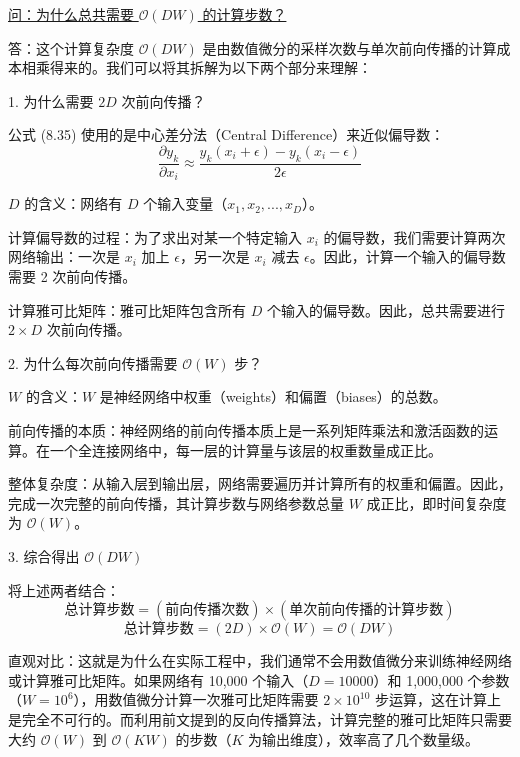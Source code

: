 \documentclass{article}
\begin{document}
{\color{blue}
\underline{问：为什么总共需要 $\mathcal{O}(DW)$ 的计算步数？}

答：这个计算复杂度 $\mathcal{O}(DW)$ 是由数值微分的采样次数与单次前向传播的计算成本相乘得来的。我们可以将其拆解为以下两个部分来理解：

1. 为什么需要 $2D$ 次前向传播？

公式 (8.35) 使用的是中心差分法（Central Difference）来近似偏导数：
$$ \frac{\partial y_k}{\partial x_i} \approx \frac{y_k(x_i + \epsilon) - y_k(x_i - \epsilon)}{2\epsilon} $$

$D$ 的含义：网络有 $D$ 个输入变量（$x_1, x_2, ..., x_D$）。

计算偏导数的过程：为了求出对某一个特定输入 $x_i$ 的偏导数，我们需要计算两次网络输出：一次是 $x_i$ 加上 $\epsilon$，另一次是 $x_i$ 减去 $\epsilon$。因此，计算一个输入的偏导数需要 2 次前向传播。

计算雅可比矩阵：雅可比矩阵包含所有 $D$ 个输入的偏导数。因此，总共需要进行 $2 \times D$ 次前向传播。

2. 为什么每次前向传播需要 $\mathcal{O}(W)$ 步？

$W$ 的含义：$W$ 是神经网络中权重（weights）和偏置（biases）的总数。

前向传播的本质：神经网络的前向传播本质上是一系列矩阵乘法和激活函数的运算。在一个全连接网络中，每一层的计算量与该层的权重数量成正比。

整体复杂度：从输入层到输出层，网络需要遍历并计算所有的权重和偏置。因此，完成一次完整的前向传播，其计算步数与网络参数总量 $W$ 成正比，即时间复杂度为 $\mathcal{O}(W)$。

3. 综合得出 $\mathcal{O}(DW)$

将上述两者结合：
$$ \text{总计算步数} = (\text{前向传播次数}) \times (\text{单次前向传播的计算步数}) $$
$$ \text{总计算步数} = (2D) \times \mathcal{O}(W) = \mathcal{O}(DW) $$

直观对比：这就是为什么在实际工程中，我们通常不会用数值微分来训练神经网络或计算雅可比矩阵。如果网络有 10,000 个输入（$D=10000$）和 1,000,000 个参数（$W=10^6$），用数值微分计算一次雅可比矩阵需要 $2 \times 10^{10}$ 步运算，这在计算上是完全不可行的。而利用前文提到的反向传播算法，计算完整的雅可比矩阵只需要大约 $\mathcal{O}(W)$ 到 $\mathcal{O}(KW)$ 的步数（$K$ 为输出维度），效率高了几个数量级。


}
\end{document}
